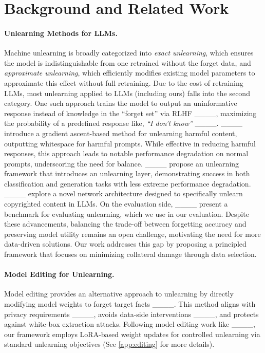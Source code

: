 \section{Background and Related Work}
\paragraph{Unlearning Methods for LLMs.} Machine unlearning is broadly categorized into \emph{exact unlearning}, which ensures the model is indistinguishable from one retrained without the forget data, and \emph{approximate unlearning}, which efficiently modifies existing model parameters to approximate this effect without full retraining. 
Due to the cost of retraining LLMs, most unlearning applied to LLMs (including ours) falls into the second category. 
One such approach trains the model to output an uninformative response instead of knowledge in the ``forget set'' via RLHF ____, maximizing the probability of a predefined response like, \emph{``I don't know''} ____. 
____ introduce a gradient ascent-based method for unlearning harmful content, outputting whitespace for harmful prompts. 
While effective in reducing harmful responses, this approach leads to notable performance degradation on normal prompts, underscoring the need for balance. 
____ propose an unlearning framework that introduces an unlearning layer, demonstrating success in both classification and generation tasks with less extreme performance degradation. 
____ explore a novel network architecture designed to specifically unlearn copyrighted content in LLMs. 
On the evaluation side, ____ present a benchmark for evaluating unlearning, which we use in our evaluation. 
Despite these advancements, balancing the trade-off between forgetting accuracy and preserving model utility remains an open challenge, motivating the need for more data-driven solutions. 
Our work addresses this gap by proposing a principled framework that focuses on minimizing collateral damage through data selection.

\paragraph{Model Editing for Unlearning.} Model editing provides an alternative approach to unlearning by directly modifying model weights to forget target facts ____. This method aligns with privacy requirements ____, avoids data-side interventions ____, and protects against white-box extraction attacks. Following model editing work like ____, our framework employs LoRA-based weight updates for controlled unlearning via standard unlearning objectives (See \cref{app:editing} for more details). 





